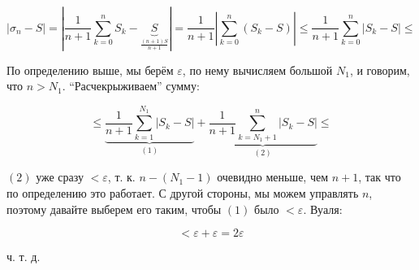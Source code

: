 \documentclass{article}
\begin{document}
\[\left|\sigma_n - S\right| = \left|\frac{1}{n + 1}\sum_{k = 0}^{n}S_k - \underbrace{S}_{\frac{(n + 1)S}{n + 1}}\right| = \frac{1}{n + 1} \left|\sum_{k = 0}^{n} \left(S_k - S\right)\right| \le \frac{1}{n + 1}\sum_{k = 0}^{n}\left|S_k - S\right| \le\]

По определению выше, мы берём $\varepsilon$, по нему вычисляем большой $N_1$, и говорим, что $n > N_{1}$. ``Расчекрыживаем'' сумму:

\[\le \underbrace{\frac{1}{n + 1}\sum_{k = 1}^{N_1} |S_k - S|}_{(1)} + \underbrace{\frac{1}{n + 1}\sum_{k = N_1 + 1}^{n} |S_k - S|}_{(2)} \le \]

$(2)$ уже сразу $< \varepsilon$, т. к. $n - (N_1 - 1)$ очевидно меньше, чем $n + 1$, так что по определению это работает. С другой стороны, мы можем управлять $n$, поэтому давайте выберем его таким, чтобы $(1)$ было $< \varepsilon$. Вуаля: 

\[< \varepsilon + \varepsilon = 2 \varepsilon\]

ч. т. д. 

\newpage
\end{document}
